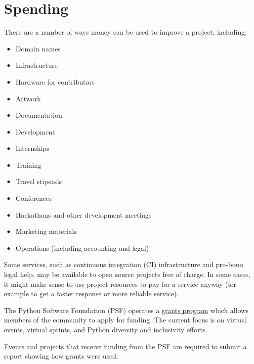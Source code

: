 


\chapter{Spending}

There are a number of ways money can be used to improve a project, including:

\begin{itemize}

\item Domain names
\item Infrastructure
\item Hardware for contributors
\item Artwork
\item Documentation
\item Development
\item Internships
\item Training
\item Travel stipends
\item Conferences
\item Hackathons and other development meetings
\item Marketing materials
\item Operations (including accounting and legal)

\end{itemize}

Some services, such as continuous integration (CI) infrastructure and pro-bono legal help, may be available to open source projects free of charge.  In some cases, it might make sense to use project resources to pay for a service anyway (for example to get a faster response or more reliable service).

\begin{kaobox}[frametitle=PSF Grants Program]

The Python Software Foundation (PSF) operates a \href{https://www.python.org/psf/grants/}{grants program} which allows members of the community to apply for funding.  The current focus is on virtual events, virtual sprints, and Python diversity and inclusivity efforts.

Events and projects that receive funding from the PSF are required to submit a report showing how grants were used.

\end{kaobox}

